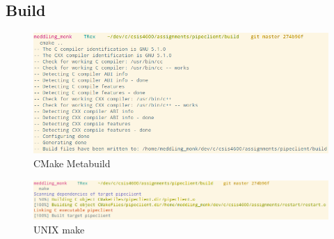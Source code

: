 \documentclass[letter,12pt,sffamily]{article}
\begin{document}
\subsection{Build}
\begin{figure}[H]
	\centering
	\includegraphics[width=1\linewidth]{./images/13}
	\caption[CMake_prep]{CMake Metabuild}
	\label{fig:14}
\end{figure}
\begin{figure}[H]
	\centering
	\includegraphics[width=1\linewidth]{./images/14}
	\caption[make_build]{UNIX make}
	\label{fig:15}
\end{figure}
\end{document}
